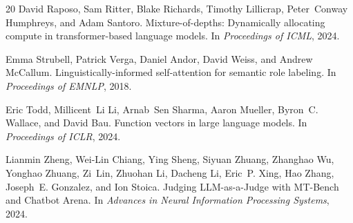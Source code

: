 \documentclass[11pt,a4paper]{article}
\begin{document}
\begin{thebibliography}{20}
David Raposo, Sam Ritter, Blake Richards, Timothy Lillicrap, Peter~Conway Humphreys, and Adam Santoro.
\newblock Mixture-of-depths: Dynamically allocating compute in transformer-based language models.
\newblock In \emph{Proceedings of ICML}, 2024.

Emma Strubell, Patrick Verga, Daniel Andor, David Weiss, and Andrew McCallum.
\newblock Linguistically-informed self-attention for semantic role labeling.
\newblock In \emph{Proceedings of EMNLP}, 2018.

Eric Todd, Millicent~Li Li, Arnab~Sen Sharma, Aaron Mueller, Byron~C. Wallace, and David Bau.
\newblock Function vectors in large language models.
\newblock In \emph{Proceedings of ICLR}, 2024.

Lianmin Zheng, Wei-Lin Chiang, Ying Sheng, Siyuan Zhuang, Zhanghao Wu, Yonghao Zhuang, Zi~Lin, Zhuohan Li, Dacheng Li, Eric~P. Xing, Hao Zhang, Joseph~E. Gonzalez, and Ion Stoica.
\newblock Judging LLM-as-a-Judge with MT-Bench and Chatbot Arena.
\newblock In \emph{Advances in Neural Information Processing Systems}, 2024.

\end{thebibliography}
\end{document}
